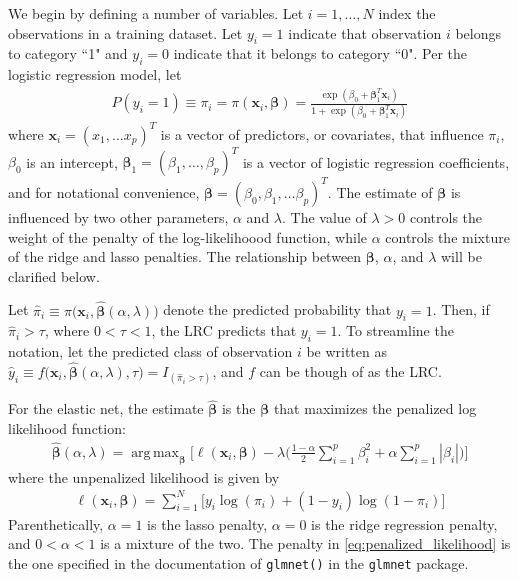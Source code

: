 \documentclass{article}
\DeclareMathOperator*{\argmax}{arg\,max}
\begin{document}
We begin by defining a
number of variables.  Let $i = 1,\ldots,N$ index the observations in a training dataset. 
Let $y_i = 1$ indicate that observation $i$ belongs to category ``1" and $y_i = 0$ indicate
that it belongs to category ``0".  Per the logistic regression model, let  
\begin{align}
P(y_i = 1) \equiv \pi_i = \pi(\mathbf{x}_i, \boldsymbol{\beta}) = 
\frac{\exp(\beta_0 + \boldsymbol{\beta}_1^T \mathbf{x}_i)}{1+\exp(\beta_0 + \boldsymbol{\beta}_1^T \mathbf{x}_i)}
\end{align}
\noindent where $\mathbf{x}_i = (x_1, \ldots x_p)^T$ is a vector of predictors, or covariates, that
influence $\pi_i$, $\beta_0$ is an intercept, $\boldsymbol{\beta}_1 = (\beta_1, \ldots, \beta_p)^T$ is a 
vector of  logistic regression coefficients, and for notational convenience, 
$\boldsymbol{\beta} = (\beta_0, \beta_1, \ldots \beta_p)^T$. The estimate of $\boldsymbol{\beta}$ is influenced by 
two other parameters, 
$\alpha$ and $\lambda$.  The value of $\lambda > 0$ controls the weight of the
penalty of the log-likelihoood function, while $\alpha$ controls the mixture of the ridge and lasso penalties.  
The relationship between $\boldsymbol{\beta}$, $\alpha$, and $\lambda$ will be clarified below.

Let $\hat\pi_i \equiv \pi \bigl( \mathbf{x}_i,\hat{\boldsymbol{\beta}}(\alpha,\lambda) \bigr)$ denote the predicted probability 
that $y_i = 1$.  Then, if $\hat\pi_i > \tau$, where $0 < \tau < 1$, the LRC predicts 
that $y_i = 1$.  To streamline the notation, let the predicted class of observation
$i$ be written as $\hat{y}_i \equiv f \bigl( \mathbf{x}_i,\hat{\boldsymbol{\beta}}(\alpha,\lambda),\tau \bigr) = 
I_{(\hat\pi_i > \tau)}$, and $f$ can be though of as the LRC.

For the elastic net, the estimate $\hat{\boldsymbol{\beta}}$ is the $\boldsymbol{\beta}$
that maximizes the penalized log likelihood function:
\begin{align}
\label{eq:penalized_likelihood}
\hat{\boldsymbol{\beta}}(\alpha,\lambda) = \argmax_{\boldsymbol{\beta}} \Biggl[ \ell(\mathbf{x}_i,\boldsymbol{\beta}) - \lambda 
\biggl( \frac{1-\alpha}{2} \sum_{i=1}^p \beta_i^2 + \alpha \sum_{i=1}^p |\beta_i| \biggr) \Biggr]
\end{align}
\noindent where the unpenalized likelihood is given by
\begin{align}
\ell(\mathbf{x}_i,\boldsymbol{\beta}) = \sum_{i=1}^N \bigl[ y_i \log(\pi_i) + (1 - y_i)\log(1-\pi_i) \bigr]
\end{align}
\noindent Parenthetically, $\alpha = 1$ is the lasso penalty, $\alpha = 0$ is the ridge regression penalty,
and $0 < \alpha < 1$ is a mixture of the two. The penalty in \eqref{eq:penalized_likelihood} is the one
specified in the documentation of {\tt glmnet()} in the {\tt glmnet} package.
\end{document}
